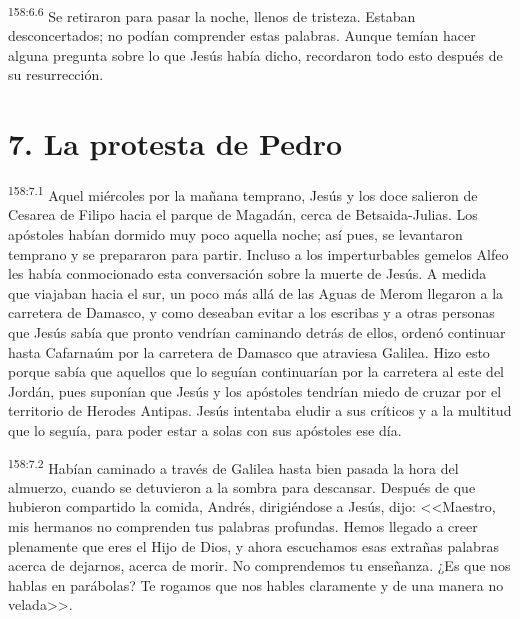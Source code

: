 \par 
\textsuperscript{158:6.6} Se retiraron para pasar la noche, llenos de tristeza. Estaban desconcertados; no podían comprender estas palabras. Aunque temían hacer alguna pregunta sobre lo que Jesús había dicho, recordaron todo esto después de su resurrección.

\section*{7. La protesta de Pedro}
\par 
\textsuperscript{158:7.1} Aquel miércoles por la mañana temprano, Jesús y los doce salieron de Cesarea de Filipo hacia el parque de Magadán, cerca de Betsaida-Julias. Los apóstoles habían dormido muy poco aquella noche; así pues, se levantaron temprano y se prepararon para partir. Incluso a los imperturbables gemelos Alfeo les había conmocionado esta conversación sobre la muerte de Jesús. A medida que viajaban hacia el sur, un poco más allá de las Aguas de Merom llegaron a la carretera de Damasco, y como deseaban evitar a los escribas y a otras personas que Jesús sabía que pronto vendrían caminando detrás de ellos, ordenó continuar hasta Cafarnaúm por la carretera de Damasco que atraviesa Galilea. Hizo esto porque sabía que aquellos que lo seguían continuarían por la carretera al este del Jordán, pues suponían que Jesús y los apóstoles tendrían miedo de cruzar por el territorio de Herodes Antipas. Jesús intentaba eludir a sus críticos y a la multitud que lo seguía, para poder estar a solas con sus apóstoles ese día.

\par 
\textsuperscript{158:7.2} Habían caminado a través de Galilea hasta bien pasada la hora del almuerzo, cuando se detuvieron a la sombra para descansar. Después de que hubieron compartido la comida, Andrés, dirigiéndose a Jesús, dijo: <<Maestro, mis hermanos no comprenden tus palabras profundas. Hemos llegado a creer plenamente que eres el Hijo de Dios, y ahora escuchamos esas extrañas palabras acerca de dejarnos, acerca de morir. No comprendemos tu enseñanza. ¿Es que nos hablas en parábolas? Te rogamos que nos hables claramente y de una manera no velada>>.

